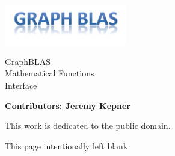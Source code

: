 
  \begin{titlepage}
    \begin{flushleft}
     \hspace{-6em} \includegraphics[width=0.4\textwidth]{graphblas-logo.png}
    \end{flushleft}

    \begin{adjustwidth}{-0.75in}{0in}
    \begin{center}
      \Huge
      \textsf{GraphBLAS\\Mathematical Functions \\Interface}

      \vspace{0.5in}\textsf{}\vspace{-0.7in}
      \normalsize

      \vspace{1.0in}

      \textbf{Contributors: Jeremy Kepner}
    \end{center}
    \end{adjustwidth}

    \vspace{3.0in}

\begin{adjustwidth}{0pt}{1em}\setlength{\parskip}{0.25\baselineskip}%
This work is dedicated to the public domain.
\end{adjustwidth}

  \end{titlepage}


\clearpage
\thispagestyle{empty}
\phantom{a}
This page intentionally left blank
\vfill

